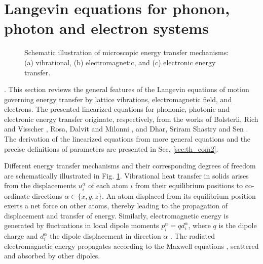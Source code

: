 

% 

\section{Langevin equations for phonon, photon and electron systems}
\label{sec:th_eom1}

\begin{figure}
 \begin{center}
 \end{center}
 \caption{Schematic illustration of microscopic energy transfer mechanisms: (a) vibrational, (b) electromagnetic, and (c) electronic energy transfer.}
 \label{fig:mechanisms}
\end{figure}
. This section reviews the general features of the Langevin equations of motion governing energy transfer by lattice vibrations, electromagnetic field, and electrons. The presented linearized equations for phononic, photonic and electronic energy transfer originate, respectively, from the works of Bolsterli, Rich and Visscher \cite{bolsterli70}, Rosa, Dalvit and Milonni \cite{rosa10,rosa11}, and Dhar, Sriram Shastry and Sen \cite{dhar03,dhar06b}. The derivation of the linearized equations from more general equations and the precise definitions of parameters are presented in Sec. \ref{sec:th_eom2}. %

Different energy transfer mechanisms and their corresponding degrees of freedom are schematically illustrated in Fig. \ref{fig:mechanisms}. Vibrational heat transfer in solids arises from the displacements $u_i^{\alpha}$ of each atom $i$ from their equilibrium positions to co-ordinate directions $\alpha\in\{x,y,z\}$. An atom displaced from its equilibrium position exerts a net force on other atoms, thereby leading to the propagation of displacement and transfer of energy. Similarly, electromagnetic energy is generated by fluctuations in local dipole moments $p_i^{\alpha}=qd_i^{\alpha}$, where $q$ is the dipole charge and $d_i^{\alpha}$ the dipole displacement in direction $\alpha$ \cite{rosa10}. The radiated electromagnetic energy propagates according to the Maxwell equations \cite{novotny}, scattered and absorbed by other dipoles. 


